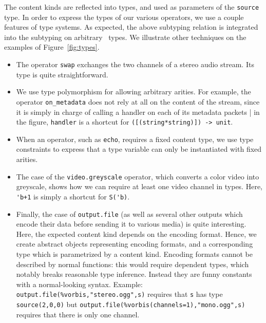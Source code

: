 The content kinds are reflected into types,
and used as parameters of the \texttt{source} type.
In order to express the types of our various operators,
we use a couple features of type systems.
As expected, the above subtyping relation is integrated into
the subtyping on arbitrary \liquidsoap\ types.
We illustrate other techniques on the examples of Figure~\ref{fig:types}.
\begin{itemize}
\item
  The operator \texttt{swap} exchanges
  the two channels of a stereo audio stream.
  Its type is quite straightforward.
\item
  We use type polymorphism for allowing arbitrary arities.
  For example, the operator \verb.on_metadata. does not rely
  at all on the content of the stream, since it is simply in
  charge of calling a handler on each of its metadata packets |
  in the figure, \verb.handler. is a shortcut for
  \verb.([(string*string)]) -> unit..
\item
  When an operator, such as \verb.echo.,
  requires a fixed content type, we use type constraints
  to express that a type variable can only be instantiated with
  fixed arities.
\item
  The case of the \texttt{video.greyscale} operator,
  which converts a color video into greyscale, shows how we can
  require at least one video channel in types.
  Here, \verb.'b+1. is simply a shortcut for \verb.S('b)..
\item
  Finally, the case of \verb#output.file# (as well as several other outputs
  which encode their data before sending it to various media) is quite
  interesting.
  Here, the expected content kind depends on the encoding format.
  Hence, we create abstract objects representing encoding formats,
  and a corresponding type which is parametrized by a content kind.
  Encoding formats cannot be described by normal functions:
  this would require dependent types, which notably breaks reasonable
  type inference.
  Instead they are funny constants with a normal-looking syntax.
  Example: \verb$output.file(%vorbis,"stereo.ogg",s)$ requires that
  \verb.s. has type \verb.source(2,0,0). but
  \verb$output.file(%vorbis(channels=1),"mono.ogg",s)$
  requires that there is only one channel.
\end{itemize}

